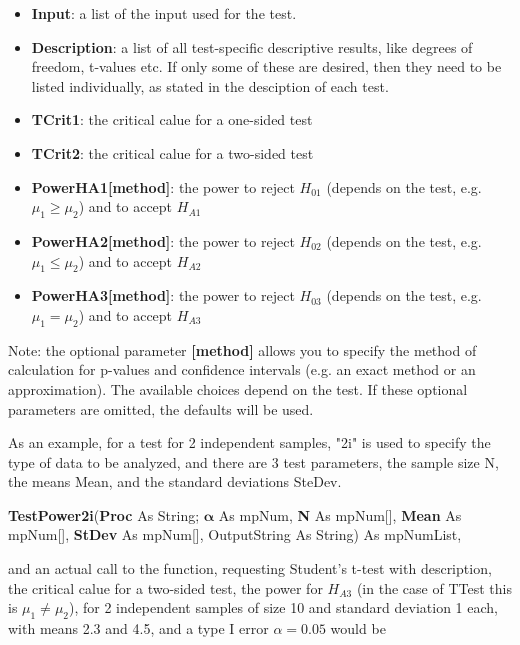 \begin{itemize}
	\item \textbf{Input}: a list of the input used for the test.
	\item \textbf{Description}: a list of all test-specific descriptive results, like degrees of freedom, t-values etc. If only some of these are desired, then they need to be listed individually, as stated in the desciption of each test.
	\item \textbf{TCrit1}: the critical calue for a one-sided test
	\item \textbf{TCrit2}: the critical calue for a two-sided test
	\item \textbf{PowerHA1[method]}: the power to reject $H_{01}$ (depends on the test, e.g. $\mu_1 \geq \mu_2$) and to accept $H_{A1}$
	\item \textbf{PowerHA2[method]}: the power to reject $H_{02}$ (depends on the test, e.g. $\mu_1 \leq \mu_2$) and to accept $H_{A2}$
	\item \textbf{PowerHA3[method]}: the power to reject $H_{03}$ (depends on the test, e.g. $\mu_1 = \mu_2$) and to accept $H_{A3}$
\end{itemize}
Note: the optional parameter \textbf{[method]} allows you to specify the method of calculation for p-values and confidence intervals (e.g. an exact method or an approximation). The available choices depend on the test. If these optional parameters are omitted, the defaults will be used.

\vspace{0.3cm}
As an example, for a test for 2 independent samples, "2i" is used to specify the type of data to be analyzed,  and there are 3 test parameters, the sample size \textsf{N}, the means  \textsf{Mean}, and the standard deviations \textsf{SteDev}.

\vspace{0.3cm}
\textsf{\textbf{TestPower2i}(\textbf{Proc} As String; $\boldsymbol{\alpha}$ As mpNum,  \textbf{N} As mpNum[], \textbf{Mean} As mpNum[],  \textbf{StDev} As mpNum[], OutputString As String) As mpNumList}, 

\vspace{0.3cm}
and an actual call to the function, requesting Student's t-test with description, the critical calue for a two-sided test, the power for $H_{A3}$ (in the case of \textsf{TTest} this is $\mu_1 \neq \mu_2$), for 2 independent samples of size 10 and standard deviation 1 each, with means 2.3 and 4.5, and a type I error $\alpha=0.05$ would be

